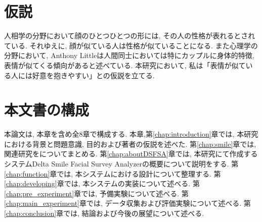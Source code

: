 \section{仮説}
人相学の分野において顔のひとつひとつの形には, その人の性格が表れるとされている.
それゆえに, 顔が似ている人は性格が似ていることになる.
また心理学の分野において, Anthony Littleは人間同士においては特にカップルに身体的特徴,
表情が似てくる傾向があると述べている.\cite{AnthonyLittle}
本研究において, 私は「表情が似ている人には好意を抱きやすい」との仮説を立てる.




\section{本文書の構成}

本論文は, 本章を含め全8章で構成する.
本章,第\ref{chap:introduction}章では, 本研究における背景と問題意識, 目的および著者の仮説を述べた.
第\ref{chap:smile}章では, 関連研究をについてまとめる.
第\ref{chap:aboutDSFSA}章では, 本研究にて作成するシステムDelta Smile Facial Survey Analyzerの概要について説明をする.
第\ref{chap:function}章では, 本システムにおける設計について整理する.
第\ref{chap:developing}章では, 本システムの実装について述べる.
第\ref{chap:pre_experiment}章では, 予備実験について述べる.
第\ref{chap:main_experiment}章では, データ収集および評価実験について述べる.
第\ref{chap:conclusion}章では, 結論および今後の展望について述べる.

